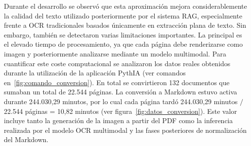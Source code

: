 Durante el desarrollo se observó que esta aproximación mejora considerablemente la calidad del texto utilizado posteriormente por el sistema RAG, especialmente frente a OCR tradicionales basados únicamente en extracción plana de texto. Sin embargo, también se detectaron varias limitaciones importantes. La principal es el elevado tiempo de procesamiento, ya que cada página debe renderizarse como imagen y posteriormente analizarse mediante un modelo multimodal. Para cuantificar este coste computacional se analizaron los datos reales obtenidos durante la utilización de la aplicación PythIA (ver comandos en~\ref{fig:comando_conversion}). En total se convirtieron 132 documentos que sumaban un total de 22.544 páginas. La conversión a Markdown estuvo activa durante 244.030,29 minutos, por lo cual cada página tardó 244.030,29 minutos $/$ 22.544 páginas = 10,82 minutos (ver figura~\ref{fig:datos_conversion}). Este valor incluye tanto la generación de la imagen a partir del PDF como la inferencia realizada por el modelo OCR multimodal y las fases posteriores de normalización del Markdown.

